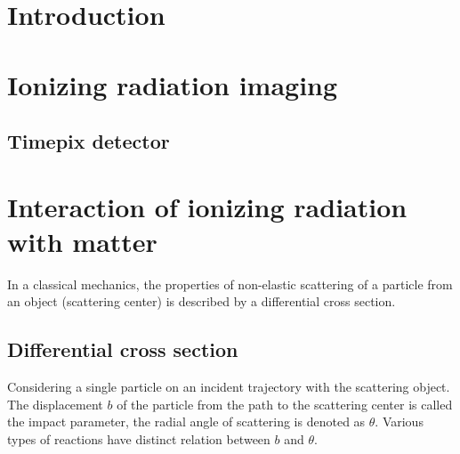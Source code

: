 \documentclass[a4paper,12pt,titlepage, twoside]{article}
\begin{document}


\section{Introduction}



\section{Ionizing radiation imaging}


\subsection{Timepix detector}



\clearpage


\section{Interaction of ionizing radiation with matter}


In a classical mechanics, the properties of non-elastic scattering of a particle from an object (scattering center) is described by a differential cross section.

\subsection{Differential cross section}

Considering a single particle on an incident trajectory with the scattering object.
The displacement $b$ of the particle from the path to the scattering center is called the impact parameter, the radial angle of scattering is denoted as $\theta$.
Various types of reactions have distinct relation between $b$ and $\theta$.
\end{document}
